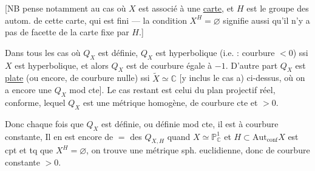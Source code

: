 [NB  pense notamment au cas où $X$ est associé à une \uline{carte}, et $H$ est le groupe des autom. de cette carte, qui est fini --- la condition $X^H=\varnothing$ signifie aussi qu'il n'y a pas de facette de la carte fixe par $H$.]

Dans tous les cas où $Q_X$ est définie, $Q_X$ est hyperbolique (i.e. : courbure $<0$) ssi $X$ est hyperbolique, et alors $Q_X$ est de courbure  égale à $-1$. D'autre part $Q_X$ est \uline{plate}  (ou encore, de courbure nulle) ssi $\widetilde X\simeq\mathbb C$ [y inclus le cas a) ci-dessus, où on a encore une $Q_X$ mod cte]. Le cas restant est celui du plan projectif réel, conforme,   lequel $Q_X$ est une métrique homogène, de courbure cte  et $>0$.

Donc chaque fois que $Q_X$ est définie, ou définie mod cte, il est à courbure constante,  Il en est encore de $=$ des $Q_{X,H}$ quand $X\simeq\mathbb P^1_{\mathbb C}$ et $H\subset\mathrm{Aut}_{\mathrm{conf}}X$ est cpt et tq que $X^H=\varnothing$, on trouve une métrique sph. euclidienne, donc de courbure constante $>0$.

